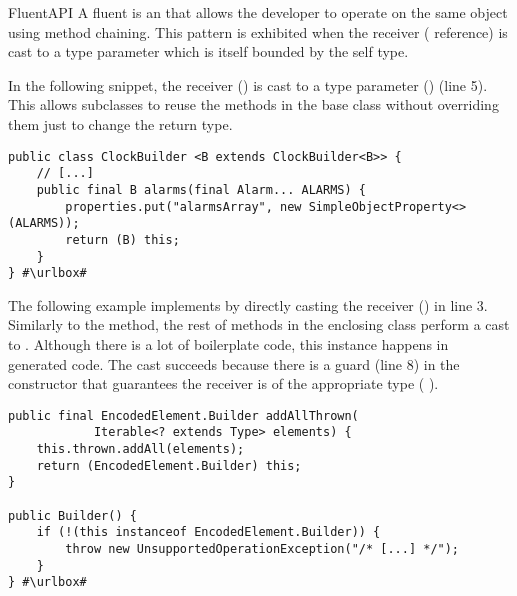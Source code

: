 \begin{pattern}{FluentAPI}
A fluent \api{} is an \api{} that allows the developer to operate on the same
object using method chaining.
This pattern is exhibited when the receiver ( reference) is cast to a type parameter which is itself bounded by the self type.


\instances{}
In the following snippet,
the receiver () is cast to a type parameter () (line 5).
This allows subclasses to reuse the methods in the base class without overriding them just to change the return type.

\def\urlvar{http://bit.ly/HanSolo_Medusa_2TyBObH}
\begin{verbatim}
public class ClockBuilder <B extends ClockBuilder<B>> {
    // [...]
    public final B alarms(final Alarm... ALARMS) {
        properties.put("alarmsArray", new SimpleObjectProperty<>(ALARMS));
        return (B) this;
    }
} #\urlbox#
\end{verbatim}

The following example implements \thisp{} by directly casting the receiver
() in line 3.
Similarly to the  method,
the rest of methods in the enclosing class perform a cast to .
Although there is a lot of boilerplate code,
this instance happens in generated code.
The cast succeeds because there is a guard (line 8) in the constructor that 
guarantees the receiver is of the appropriate type (\cf{} ).

\def\urlvar{http://bit.ly/immutables_immutables_2S4BoJs}
\begin{verbatim}
public final EncodedElement.Builder addAllThrown(
            Iterable<? extends Type> elements) {
    this.thrown.addAll(elements);
    return (EncodedElement.Builder) this;
}

public Builder() {
    if (!(this instanceof EncodedElement.Builder)) {
        throw new UnsupportedOperationException("/* [...] */");
    }
} #\urlbox#
\end{verbatim}



\end{pattern}
